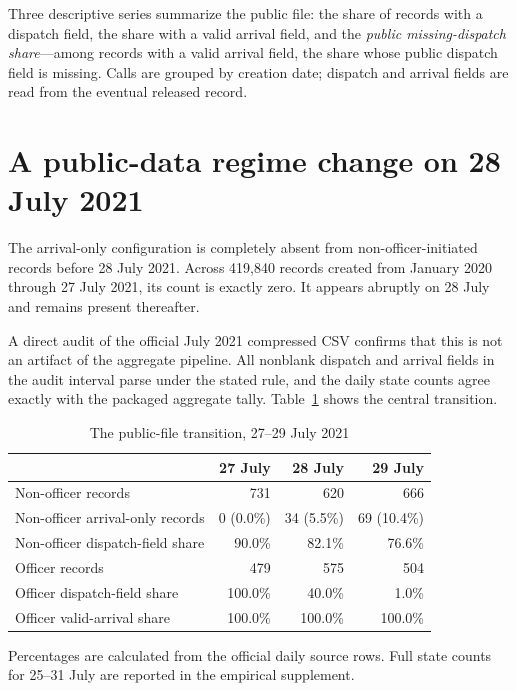 \documentclass[11pt]{article}
\begin{document}
Three descriptive series summarize the public file: the share of records with a dispatch field, the share with a valid arrival field, and the \emph{public missing-dispatch share}---among records with a valid arrival field, the share whose public dispatch field is missing. Calls are grouped by creation date; dispatch and arrival fields are read from the eventual released record.

\section{A public-data regime change on 28 July 2021}

The arrival-only configuration is completely absent from non-officer-initiated records before 28 July 2021. Across 419,840 records created from January 2020 through 27 July 2021, its count is exactly zero. It appears abruptly on 28 July and remains present thereafter.

A direct audit of the official July 2021 compressed CSV confirms that this is not an artifact of the aggregate pipeline. All nonblank dispatch and arrival fields in the audit interval parse under the stated rule, and the daily state counts agree exactly with the packaged aggregate tally. Table~\ref{tab:julybreak} shows the central transition.

\begin{table}[!htbp]
\centering
\caption{The public-file transition, 27--29 July 2021}
\label{tab:julybreak}
\begin{tabular}{@{}lrrr@{}}
\toprule
 & 27 July & 28 July & 29 July \\
\midrule
Non-officer records & 731 & 620 & 666 \\
Non-officer arrival-only records & 0 (0.0\%) & 34 (5.5\%) & 69 (10.4\%) \\
Non-officer dispatch-field share & 90.0\% & 82.1\% & 76.6\% \\
Officer records & 479 & 575 & 504 \\
Officer dispatch-field share & 100.0\% & 40.0\% & 1.0\% \\
Officer valid-arrival share & 100.0\% & 100.0\% & 100.0\% \\
\bottomrule
\end{tabular}
\begin{minipage}{0.96\textwidth}\footnotesize
Percentages are calculated from the official daily source rows. Full state counts for 25--31 July are reported in the empirical supplement.
\end{minipage}
\end{table}
\end{document}
